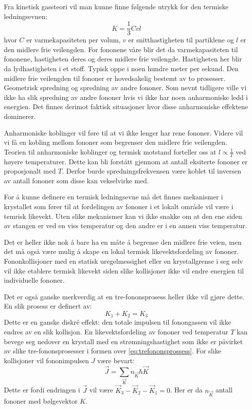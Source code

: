 \documentclass{article}
\begin{document}
Fra kinetisk gassteori vil man kunne finne følgende utrykk for den termiske ledningsevnen:
\begin{equation}
    K = \frac{1}{3} C v l
\end{equation}
hvor $C$ er varmekapasiteten per volum, $v$ er snitthastigheten til partiklene og $l$ er den midlere frie veilengden. For fononene våre blir det da varmekapasiteten til fononene, hastigheten deres og deres midlere frie veilengde. Hastigheten her blir da lydhastigheten i et stoff. Typisk oppe i noen hundre meter per sekund.
Den midlere frie veilengden til fononer er hovedsakelig bestemt av to prosesser. Geometrisk spredning og spredning av andre fononer. Som nevnt tidligere ville vi ikke ha slik spredning av andre fononer hvis vi ikke har noen anharmoniske ledd i energien. Det finnes derimot faktisk situasjoner hvor disse anharmoniske effektene dominerer.

Anharmoniske koblinger vil føre til at vi ikke lenger har rene fononer. Videre vil vi få en kobling mellom fononer som begrenser den midlere frie veilengden. Teorien til anharmoniske koblinger og termisk motstand forteller oss at $l \propto \frac{1}{T}$ ved høyere temperaturer. Dette kan bli forstått gjennom at antall eksiterte fononer er proposjonalt med $T$. Derfor burde spredningsfrekvensen være koblet til inversen av antall fononer som disse kan vekselvirke med.

For å kunne definere en termisk ledningsevne må det finnes mekanismer i krystallet som fører til at fordelingen av fononer i et lokalt område vil være i temrisk likevekt. Uten slike mekanismer kan vi ikke snakke om at den ene siden av stangen er ved en viss temperatur og den andre er i en annen viss temperatur.

Det er heller ikke nok å bare ha en måte å begrense den midlere frie veien, men det må også være mulig å skape en lokal termisk likevektsfordeling av fononer. Fononkollisjoner med en statisk uregelmessighet eller en krystallgrense i seg selv vil ikke etablere termisk likevekt siden slike kollisjoner ikke vil endre energien til individuelle fononer. 

Det er også ganske merkverdig at en tre-fononsprosess heller ikke vil gjøre dette. En slik prosess er definert av:
\begin{equation}
    \label{eq:trefononsprossess}
    K_1 + K_2 = K_3
\end{equation}
Dette er en ganske diskré effekt: den totale impulsen til fonongassen vil ikke endres av en slik kollisjon. En likevektsfordeling av fononer ved temperatur $T$ kan bevege seg nedover en krystall med en strømningshastighet som ikke er påvirket av slike tre-fononsprosesser i formen over \ref{eq:trefononsprossess}. For slike kollisjoner vil fononimpulsen $J$ være bevart:
\begin{equation}
    \vec{J} = \sum_{\vec{K}} n_{\vec{K}} \hbar \vec{K}
\end{equation}
Dette er fordi endringen i $\vec{J}$ vil være $\vec{K}_3 - \vec{K}_2 -\vec{K}_1 = 0$. Her er da $n_{\vec{K}}$ antall fononer med bølgevektor $K$.
\end{document}
